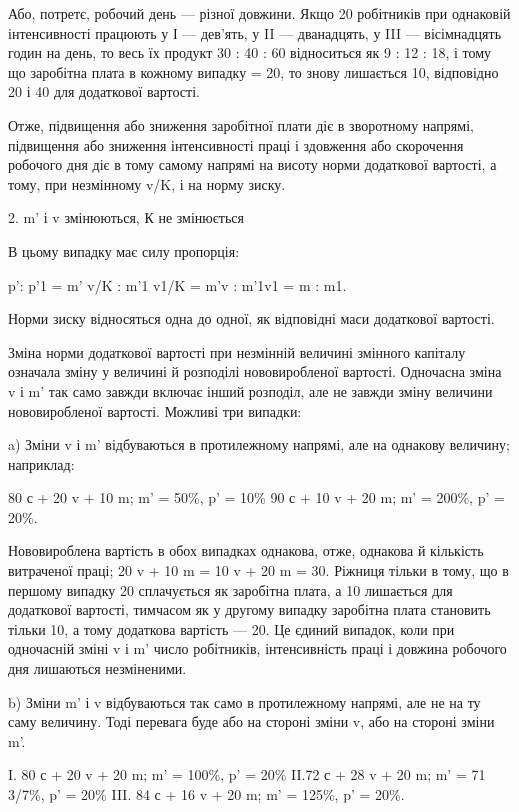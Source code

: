 Або, потретє, робочий день — різної довжини. Якщо 20 робітників
при однаковій інтенсивності працюють у І — дев’ять,
у II — дванадцять, у III — вісімнадцять годин на день, то весь їх
продукт 30 : 40 : 60 відноситься як 9 : 12 : 18, і тому що заробітна
плата в кожному випадку = 20, то знову лишається 10, відповідно
20 і 40 для додаткової вартості.

Отже, підвищення або зниження заробітної плати діє в зворотному
напрямі, підвищення або зниження інтенсивності праці
і здовження або скорочення робочого дня діє в тому самому
напрямі на висоту норми додаткової вартості, а тому, при незмінному
v/K, і на норму зиску.

2. m' і v змінюються, К не змінюється

В цьому випадку має силу пропорція:

p': p'1 = m' v/K : m'1 v1/K = m'v : m'1v1 = m : m1.

Норми зиску відносяться одна до одної, як відповідні маси
додаткової вартості.

Зміна норми додаткової вартості при незмінній величині змінного
капіталу означала зміну у величині й розподілі нововиробленої
вартості. Одночасна зміна v і m' так само завжди включає
інший розподіл, але не завжди зміну величини нововиробленої
вартості. Можливі три випадки:

a) Зміни v і m' відбуваються в протилежному напрямі, але
на однакову величину; наприклад:

80 с + 20 v + 10 m; m' = 50\%, p' = 10\%
90 с + 10 v + 20 m; m' = 200\%, p' = 20\%.

Нововироблена вартість в обох випадках однакова, отже, однакова
й кількість витраченої праці; 20 v + 10 m = 10 v + 20 m = 30.
Ріжниця тільки в тому, що в першому випадку 20 сплачується
як заробітна плата, а 10 лишається для додаткової вартості,
тимчасом як у другому випадку заробітна плата становить
тільки 10, а тому додаткова вартість — 20. Це єдиний випадок,
коли при одночасній зміні v і m' число робітників, інтенсивність
праці і довжина робочого дня лишаються незміненими.

b) Зміни m' і v відбуваються так само в протилежному напрямі,
але не на ту саму величину. Тоді перевага буде або на
стороні зміни v, або на стороні зміни m'.

I. 80 с + 20 v + 20 m; m' = 100\%, p' = 20\%
II.72 с + 28 v + 20 m; m' = 71 3/7\%, p' = 20\%
III. 84 с + 16 v + 20 m; m' = 125\%, p' = 20\%.
